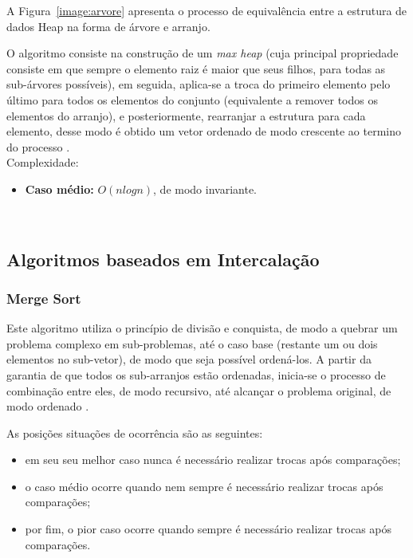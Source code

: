 \documentclass[conference,onecolumn]{IEEEtran}
\begin{document}
A Figura~\ref{image:arvore} apresenta o processo de equivalência entre a estrutura de dados Heap na forma de árvore e arranjo.

O algoritmo consiste na construção de um \textit{max heap} (cuja principal propriedade consiste em que sempre o elemento raiz é maior que seus filhos, para todas as sub-árvores possíveis), em seguida, aplica-se a troca do primeiro elemento pelo último para todos os elementos do conjunto (equivalente a remover todos os elementos do arranjo), e posteriormente, rearranjar a estrutura para cada elemento, desse modo é obtido um vetor ordenado de modo crescente ao termino do processo \cite{ziviani}.\\

Complexidade:
\begin{itemize}
\item \textbf{Caso médio:} $O (nlog n)$, de modo invariante.
\end{itemize}

~\\
\subsection{Algoritmos baseados em Intercalação}

\subsubsection{Merge Sort}

Este algoritmo utiliza o princípio de divisão e conquista, de modo a quebrar um problema complexo em sub-problemas, até o caso base (restante um ou dois elementos no sub-vetor), de modo que seja possível ordená-los. A partir da garantia de que todos os sub-arranjos estão ordenadas, inicia-se o processo de combinação entre eles, de modo recursivo, até alcançar o problema original, de modo ordenado \cite{sedgewick}.

As posições situações de ocorrência são as seguintes:
\begin{itemize}
\item em seu seu melhor caso nunca é necessário realizar trocas após comparações;
\item o caso médio ocorre quando nem sempre é necessário realizar trocas após comparações;
\item por fim, o pior caso ocorre quando sempre é necessário realizar trocas após comparações.
\end{itemize}~\\
\end{document}
